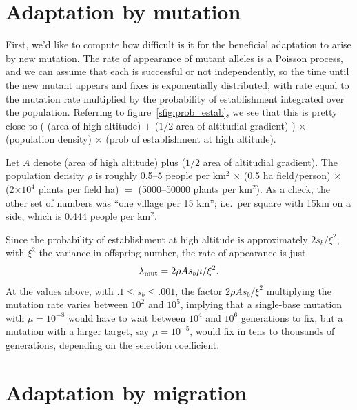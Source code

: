 \section{Adaptation by mutation}


First, we'd like to compute how difficult is it for the beneficial adaptation to arise by new mutation.
The rate of appearance of mutant alleles is a Poisson process,
and we can assume that each is successful or not independently,
so the time until the new mutant appears and fixes is exponentially distributed,
with rate equal to the mutation rate multiplied by the probability of establishment integrated over the population.
Referring to figure~\ref{sfig:prob_estab},
we see that this is pretty close to ( (area of high altitude) $+$ ($1/2$ area of altitudial gradient) ) $\times$ (population density) $\times$ (prob of establishment at high altitude).

Let $A$ denote (area of high altitude) plus ($1/2$ area of altitudial gradient).
The population density $\rho$ is roughly
0.5--5 people per km$^2$
$\times$ (0.5 ha field/person)
$\times$ (2$\times10^4$ plants per field ha)
$=$ (5000--50000 plants per km$^2$).
As a check, the other set of numbers was
``one village per 15 km''; i.e.\ per square with 15km on a side,
which is 0.444 people per km$^2$.

Since the probability of establishment at high altitude is approximately $2 s_b / \xi^2$, 
with $\xi^2$ the variance in offspring number,
the rate of appearance is just 
\begin{align*}
  \lambda_{\text{mut}} = 2 \rho A s_b \mu / \xi^2 .
\end{align*}
At the values above, with $.1 \le s_b \le .001$, the factor $2 \rho A s_b / \xi^2$ multiplying the mutation rate
varies between $10^2$ and $10^5$,
implying that a single-base mutation with $\mu=10^{-8}$ would have to wait between $10^4$ and $10^6$ generations to fix,
but a mutation with a larger target, say $\mu=10^{-5}$, would fix in tens to thousands of generations, depending on the selection coefficient.



\section{Adaptation by migration}

